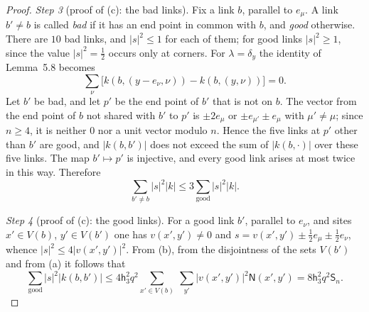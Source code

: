 \documentclass[11pt]{amsart}
\theoremstyle{definition}
\begin{document}
\begin{proof}
\emph{Step 3} (proof of (c): the bad links).
Fix a link $b$, parallel to $e_\mu$.
A link $b'\ne b$ is called \emph{bad} if it has an end point in common with $b$, and \emph{good} otherwise.
There are $10$ bad links, and $|s|^2\le1$ for each of them; for good links $|s|^2\ge1$, since the value $|s|^2=\frac12$ occurs only at corners.
For $\lambda=\delta_y$ the identity of Lemma~5.8 becomes
\begin{equation*}
\sum_\nu\bigl[k(b,(y-e_\nu,\nu))-k(b,(y,\nu))\bigr]=0.
\end{equation*}
Let $b'$ be bad, and let $p'$ be the end point of $b'$ that is not on $b$.
The vector from the end point of $b$ not shared with $b'$ to $p'$ is $\pm2e_\mu$ or $\pm e_{\mu'}\pm e_\mu$ with $\mu'\ne\mu$; since $n\ge4$, it is neither $0$ nor a unit vector modulo $n$.
Hence the five links at $p'$ other than $b'$ are good, and $|k(b,b')|$ does not exceed the sum of $|k(b,\cdot)|$ over these five links.
The map $b'\mapsto p'$ is injective, and every good link arises at most twice in this way.
Therefore
\begin{equation*}
\sum_{b'\ne b}|s|^2|k|\le3\sum_{\mathrm{good}}|s|^2|k|.
\end{equation*}

\emph{Step 4} (proof of (c): the good links).
For a good link $b'$, parallel to $e_\nu$, and sites $x'\in V(b)$, $y'\in V(b')$ one has $v(x',y')\ne0$ and $s=v(x',y')\pm\frac12e_\mu\pm\frac12e_\nu$, whence $|s|^2\le4|v(x',y')|^2$.
From (b), from the disjointness of the sets $V(b')$ and from (a) it follows that
\begin{equation*}
\sum_{\mathrm{good}}|s|^2|k(b,b')|\le4\mathsf h_3^2q^2\sum_{x'\in V(b)}\ \sum_{y'}|v(x',y')|^2\mathsf N(x',y')=8\mathsf h_3^2q^2\mathsf S_n.
\end{equation*}
\end{proof}
\end{document}
